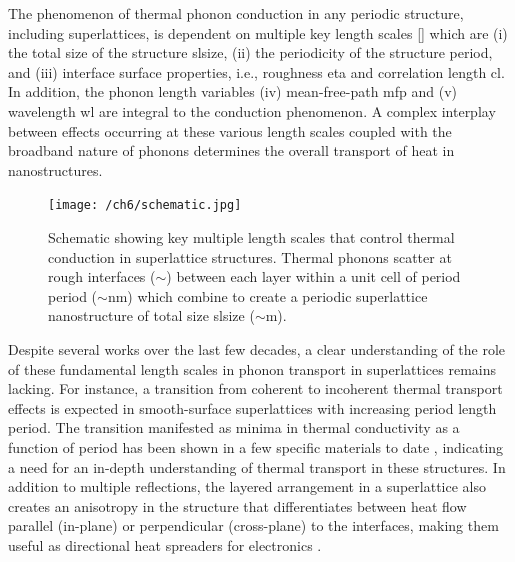 The phenomenon of thermal phonon conduction in any periodic structure, including superlattices, is dependent on multiple key length scales [] which are (i) the total size of the structure \gls{slsize}, (ii) the periodicity of the  structure \gls{period}, and (iii) interface surface properties, i.e., roughness \gls{eta} and correlation length \gls{cl}. In addition, the phonon length variables (iv) mean-free-path \gls{mfp} and (v) wavelength \gls{wl} are integral to the conduction phenomenon. A complex interplay between effects occurring at these various length scales coupled with the broadband nature of phonons determines the overall transport of heat in nanostructures. 
\begin{figure}%
	{\centering\texttt{[image: /ch6/schematic.jpg]}}
	\caption{Schematic showing key multiple length scales that control thermal conduction in superlattice structures. Thermal phonons scatter at rough interfaces ($\sim$\angstrom) between each layer within a unit cell of period \gls{period} ($\sim$nm) which combine to create a periodic superlattice nanostructure of total size \gls{slsize} ($\sim$\si{\micro}m).}
	\label{fig:sl_schematic}
\end{figure}

Despite several works over the last few decades, a clear understanding of the role of these fundamental length scales in phonon transport in superlattices remains lacking. For instance, a transition from coherent to incoherent thermal transport effects is expected in smooth-surface superlattices with increasing period length \gls{period}. The transition manifested as minima in thermal conductivity as a function of period has been shown in a few specific materials to date \cite{RN393,RN551}, indicating a need for an in-depth understanding of thermal transport in these structures. In addition to multiple reflections, the layered arrangement in a superlattice also creates an anisotropy in the structure that differentiates between heat flow parallel (in-plane) or perpendicular (cross-plane) to the interfaces, making them useful as directional heat spreaders for electronics \cite{RN545}. %

